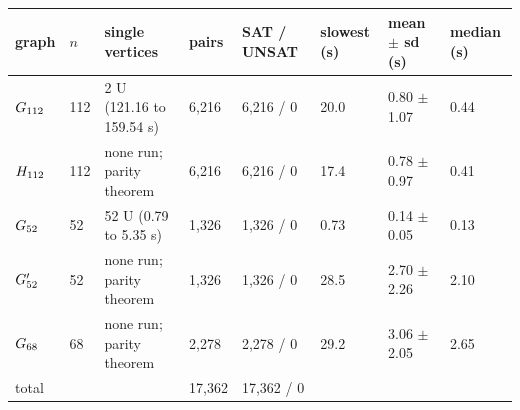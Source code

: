 \begin{tabular}{llllllll}
\toprule
graph & $n$ & single vertices & pairs & SAT / UNSAT & slowest (s) & mean $\pm$ sd (s) & median (s)\\
\midrule
$G_{112}$ & 112 & 2 U (121.16 to 159.54 s) & 6{,}216 & 6{,}216 / 0 & 20.0 & 0.80 $\pm$ 1.07 & 0.44\\
$H_{112}$ & 112 & none run; parity theorem & 6{,}216 & 6{,}216 / 0 & 17.4 & 0.78 $\pm$ 0.97 & 0.41\\
$G_{52}$ & 52 & 52 U (0.79 to 5.35 s) & 1{,}326 & 1{,}326 / 0 & 0.73 & 0.14 $\pm$ 0.05 & 0.13\\
$G'_{52}$ & 52 & none run; parity theorem & 1{,}326 & 1{,}326 / 0 & 28.5 & 2.70 $\pm$ 2.26 & 2.10\\
$G_{68}$ & 68 & none run; parity theorem & 2{,}278 & 2{,}278 / 0 & 29.2 & 3.06 $\pm$ 2.05 & 2.65\\
total & & & 17{,}362 & 17{,}362 / 0 & & &\\
\bottomrule
\end{tabular}
